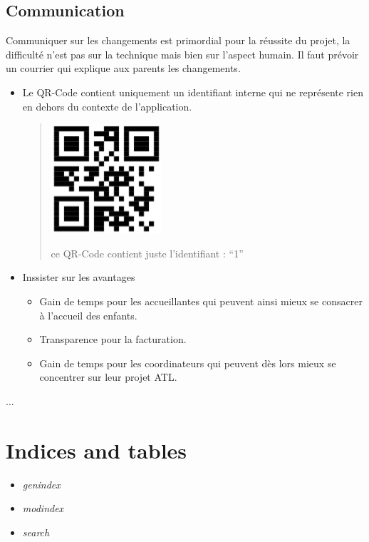 \documentclass[letterpaper,10pt,english]{sphinxmanual}
\begin{document}
\section{Communication}
\label{checklist:communication}
Communiquer sur les changements est primordial pour la réussite du projet, la difficulté n'est pas sur la technique mais bien sur l'aspect humain.
Il faut prévoir un courrier qui explique aux parents les changements.
\begin{itemize}
\item {} 
Le QR-Code contient uniquement un identifiant interne qui ne représente rien en dehors du contexte de l'application.
\begin{quote}

\includegraphics{qrcode.png}

ce QR-Code contient juste l'identifiant : ``1''
\end{quote}

\item {} 
Inssister sur les avantages
\begin{itemize}
\item {} 
Gain de temps pour les accueillantes qui peuvent ainsi mieux se consacrer à l'accueil des enfants.

\item {} 
Transparence pour la facturation.

\item {} 
Gain de temps pour les coordinateurs qui peuvent dès lors mieux se concentrer sur leur projet ATL.

\end{itemize}

\end{itemize}

...


\chapter{Indices and tables}
\label{index:indices-and-tables}\begin{itemize}
\item {} 
\emph{genindex}

\item {} 
\emph{modindex}

\item {} 
\emph{search}

\end{itemize}



\renewcommand{\indexname}{Index}
\printindex
\end{document}
